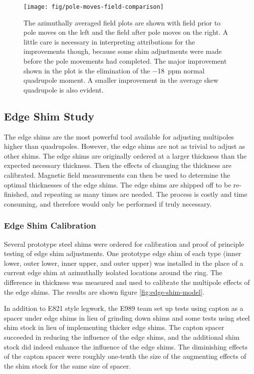 \begin{figure}
\centering
\texttt{[image: fig/pole-moves-field-comparison]}
\caption{
    The azimuthally averaged field plots are shown with field prior to pole moves on the left and the field after pole moves on the right.  A little care is necessary in interpreting attributions for the improvements though, because some shim adjustments were made before the pole movements had completed.  The major improvement shown in the plot is the elimination of the \SI{-18}{ppm} normal quadrupole moment.  A smaller improvement in the average skew quadrupole is also evident. 
    \label{fig:pole-moves-field-comparison}
}
\end{figure}

\subsection{Edge Shim Study}

The edge shims are the most powerful tool available for adjusting multipoles higher than quadrupoles.  However, the edge shims are not as trivial to adjust as other shims.  The edge shims are originally ordered at a larger thickness than the expected necessary thickness.  Then the effects of changing the thickness are calibrated.  Magnetic field measurements can then be used to determine the optimal thicknesses of the edge shims.  The edge shims are shipped off to be re-finished, and repeating as many times are needed.  The process is costly and time consuming, and therefore would only be performed if truly necessary.

\subsubsection{Edge Shim Calibration}

Several prototype steel shims were ordered for calibration and proof of principle testing of edge shim adjustments.  One prototype edge shim of each type (inner lower, outer lower, inner upper, and outer upper) was installed in the place of a current edge shim at azimuthally isolated locations around the ring.  The difference in thickness was measured and used to calibrate the multipole effects of the edge shims.  The results are shown figure \ref{fig:edge-shim-model}. 

In addition to E821 style legwork, the E989 team set up tests using capton as a spacer under edge shims in lieu of grinding down shims and some tests using steel shim stock in lieu of implementing thicker edge shims.  The capton spacer succeeded in reducing the influence of the edge shims, and the additional shim stock did indeed enhance the influence of the edge shims.  The diminishing effects of the capton spacer were roughly one-tenth the size of the augmenting effects of the shim stock for the same size of spacer.

